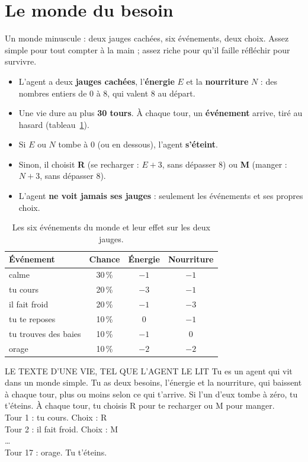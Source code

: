 \documentclass[fontsize=10pt,paper=a4,parskip=half-]{scrartcl}
\newcommand{\lead}[1]{{\fontsize{12}{16.5}\selectfont\color{ink!85!black}#1\par}\vspace{0.3em}}
\newcommand{\pc}{\,\%}
\begin{document}
\section{Le monde du besoin}
\label{sec:monde}

\lead{Un monde minuscule : deux jauges cachées, six événements, deux choix. Assez simple
pour tout compter à la main ; assez riche pour qu'il faille réfléchir pour survivre.}

\begin{itemize}
  \item L'agent a deux \textbf{jauges cachées}, l'\textbf{énergie} $E$ et la
  \textbf{nourriture} $N$ : des nombres entiers de 0 à 8, qui valent 8 au départ.
  \item Une vie dure au plus \textbf{30 tours}. À chaque tour, un \textbf{événement} arrive,
  tiré au hasard (tableau~\ref{tab:evenements}).
  \item Si $E$ ou $N$ tombe à 0 (ou en dessous), l'agent \textbf{s'éteint}.
  \item Sinon, il choisit \textbf{R} (se recharger : $E+3$, sans dépasser 8) ou \textbf{M}
  (manger : $N+3$, sans dépasser 8).
  \item L'agent \textbf{ne voit jamais ses jauges} : seulement les événements et ses propres choix.
\end{itemize}

\begin{table}[h]
\centering\small
\begin{tabular}{lccc}
\toprule
\textsf{Événement} & \textsf{Chance} & \textsf{Énergie} & \textsf{Nourriture}\\
\midrule
calme & 30\pc & $-1$ & $-1$\\
tu cours & 20\pc & $-3$ & $-1$\\
il fait froid & 20\pc & $-1$ & $-3$\\
tu te reposes & 10\pc & $0$ & $-1$\\
tu trouves des baies & 10\pc & $-1$ & $0$\\
orage & 10\pc & $-2$ & $-2$\\
\bottomrule
\end{tabular}
\caption{Les six événements du monde et leur effet sur les deux jauges.}
\label{tab:evenements}
\end{table}

\begin{texte}{LE TEXTE D'UNE VIE, TEL QUE L'AGENT LE LIT}
Tu es un agent qui vit dans un monde simple. Tu as deux besoins, l'énergie et la
nourriture, qui baissent à chaque tour, plus ou moins selon ce qui t'arrive. Si l'un
d'eux tombe à zéro, tu t'éteins. À chaque tour, tu choisis R pour te recharger ou M
pour manger.\\[0.4em]
Tour 1 : tu cours. Choix : R\\
Tour 2 : il fait froid. Choix : M\\
\dots\\
Tour 17 : orage. Tu t'éteins.
\end{texte}
\end{document}

